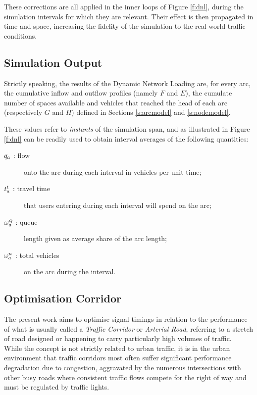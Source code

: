 These corrections are all applied in the inner loops of Figure \ref{f:dnl}, during the simulation intervals for which they are relevant. Their effect is then propagated in time and space, increasing the fidelity of the simulation to the real world traffic conditions.


\subsection{Simulation Output} \label{s:output}
Strictly speaking, the results of the Dynamic Network Loading are, for every arc, the cumulative inflow and outflow profiles (namely $F$ and $E$), the cumulate number of spaces available and vehicles that reached the head of each arc (respectively $G$ and $H$) defined in Sections \ref{s:arcmodel} and \ref{s:nodemodel}.

These values refer to \emph{instants} of the simulation span, and as illustrated in Figure \ref{f:dnl}  can be readily used to obtain interval averages of the following quantities:
\begin{description}
\item[$q_a$ : flow]  onto the arc during each interval in vehicles per unit time;

\item[$t_{a}^t$ : travel time]  that users entering during each interval will spend on the arc; 

\item[$\omega_{a}^{\scriptscriptstyle{Q}}$ : queue] length given as average share of the arc length;

\item[$\omega_{a}^{n}$ : total vehicles] on the arc during the interval.
\end{description}


\subsection{Optimisation Corridor}
The present work aims to optimise signal timings in relation to the performance of what is usually called a \emph{Traffic Corridor} or \emph{Arterial Road}, referring to a stretch of road designed or happening to carry particularly high volumes of traffic. \\
While the concept is not strictly related to urban traffic, it is in the urban environment that traffic corridors most often suffer significant performance degradation due to congestion, aggravated by the numerous intersections with other busy roads where consistent traffic flows compete for the right of way and must be regulated by traffic lights.


